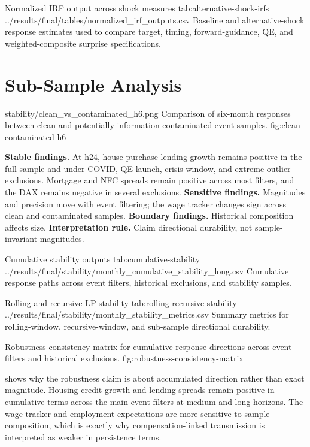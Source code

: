 \artifacttable
  {Normalized IRF output across shock measures}
  {tab:alternative-shock-irfs}
  {../results/final/tables/normalized_irf_outputs.csv}
  {Baseline and alternative-shock response estimates used to compare target, timing, forward-guidance, QE, and weighted-composite surprise specifications.}

\section{Sub-Sample Analysis}

\thesisfigure
  {stability/clean_vs_contaminated_h6.png}
  {Comparison of six-month responses between clean and potentially information-contaminated event samples.}
  {fig:clean-contaminated-h6}

\noindent\textbf{Stable findings.} At h24, house-purchase lending growth remains positive in the full sample and under COVID, QE-launch, crisis-window, and extreme-outlier exclusions. Mortgage and NFC spreads remain positive across most filters, and the DAX remains negative in several exclusions. \textbf{Sensitive findings.} Magnitudes and precision move with event filtering; the wage tracker changes sign across clean and contaminated samples. \textbf{Boundary findings.} Historical composition affects size. \textbf{Interpretation rule.} Claim directional durability, not sample-invariant magnitudes.

\artifacttable
  {Cumulative stability outputs}
  {tab:cumulative-stability}
  {../results/final/stability/monthly_cumulative_stability_long.csv}
  {Cumulative response paths across event filters, historical exclusions, and stability samples.}

\artifacttable
  {Rolling and recursive LP stability}
  {tab:rolling-recursive-stability}
  {../results/final/stability/monthly_stability_metrics.csv}
  {Summary metrics for rolling-window, recursive-window, and sub-sample directional durability.}

  {Robustness consistency matrix for cumulative response directions across event filters and historical exclusions.}
  {fig:robustness-consistency-matrix}

 shows why the robustness claim is about accumulated direction rather than exact magnitude. Housing-credit growth and lending spreads remain positive in cumulative terms across the main event filters at medium and long horizons. The wage tracker and employment expectations are more sensitive to sample composition, which is exactly why compensation-linked transmission is interpreted as weaker in persistence terms.

